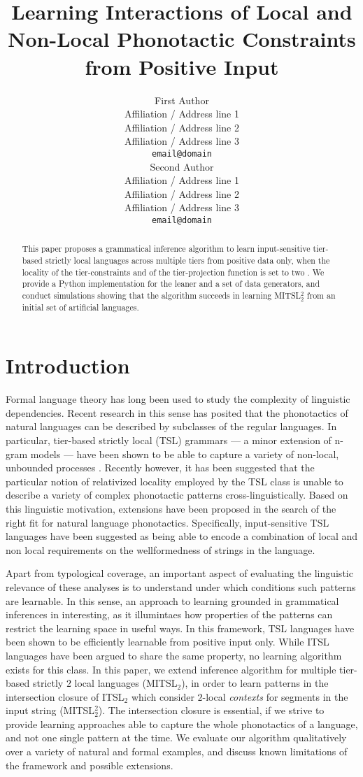 \documentclass[11pt,a4paper]{article}
\title{Learning Interactions of Local and Non-Local Phonotactic Constraints from Positive Input}
\author{First Author \\
  Affiliation / Address line 1 \\
  Affiliation / Address line 2 \\
  Affiliation / Address line 3 \\
  \texttt{email@domain} \\\And
  Second Author \\
  Affiliation / Address line 1 \\
  Affiliation / Address line 2 \\
  Affiliation / Address line 3 \\
  \texttt{email@domain} \\}
\date{}
\begin{document}
\maketitle
\begin{abstract}
This paper proposes a grammatical  inference algorithm to learn input-sensitive tier-based strictly local languages across multiple tiers from positive data only, when the locality of the tier-constraints and of the tier-projection function is set to two \cite[MITSL$^2_2$][]{desanto2019structure}.
We provide a Python implementation for the leaner and a set of data generators, and conduct simulations showing that the algorithm succeeds in learning MITSL$^2_2$ from an initial set of artificial languages.
\end{abstract}


\section{Introduction}

Formal language theory has long been used to study the complexity of linguistic dependencies.
Recent research in this sense has posited that the phonotactics of natural languages can be described by subclasses of the regular languages.
In particular, tier-based strictly local (TSL) grammars  ---  a minor extension of n-gram models --- have been shown to be able to capture a variety of non-local, unbounded processes \cite{HeinzRawalTanner,McMullin16,McMullinHansson16}.
Recently however, it has been suggested that the particular notion of relativized locality employed by the TSL class is unable to describe a variety of complex phonotactic patterns cross-linguistically.
Based on this linguistic motivation, extensions have been proposed in the search of the right fit for natural language phonotactics.
Specifically, input-sensitive TSL languages have been suggested as being able to encode a combination of local and non local requirements on the wellformedness of strings in the language.

Apart from typological coverage, an important aspect of evaluating the linguistic relevance of these analyses is to understand under which conditions such patterns are learnable.
In this sense, an approach to learning grounded in grammatical inferences in interesting, as it illumintaes how properties of the patterns can restrict the learning space in useful ways.
In this framework, TSL languages have been shown to be efficiently learnable from positive input only.
While ITSL languages have been argued to share the same property, no learning algorithm exists for this class.
In this paper, we extend \citet{McMullinSCIL2019} inference algorithm for multiple tier-based strictly $2$ local languages (MITSL$_2$), in order to learn patterns in the intersection closure of ITSL$_2$ which consider $2$-local \emph{contexts} for segments in the input string (MITSL$^2_2$). 
The intersection closure is essential, if we strive to provide learning approaches able to capture the whole phonotactics of a language, and not one single pattern at the time.
We evaluate our algorithm qualitatively over a variety of natural and formal examples, and discuss known limitations of the framework and possible extensions.
\end{document}
